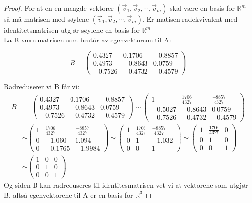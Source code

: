\documentclass[a4paper, norsk, twoside, 10pt]{article}
\begin{document}
\begin{proof}
For at en en mengde vektorer $(\vec{v}_{1}, \vec{v}_{2}, \cdots, \vec{v}_{m})$ skal være en basis for
$\mathbb{R}^{m}$ så må matrisen med søylene $(\vec{v}_{1}, \vec{v}_{2}, \cdots, \vec{v}_{m})$. Er matisen radekvivalent med identitetsmatrisen utgjør søylene en basis for $\mathbb{R}^{m}$
\\
La B være matrisen som består av egenvektorene til A:
\def\Bmatrise{
\begin{pmatrix}
  0.4327 & 0.1706 & -0.8857\\
  0.4973 & -0.8643 & 0.0759\\
  -0.7526 & -0.4732 & -0.4579
\end{pmatrix}
}

\[B = \Bmatrise\]

Radreduserer vi B får vi:
\[\begin{split}
B &= \Bmatrise \sim
\begin{pmatrix}
  1 & \frac{1706}{4327} & \frac{-8857}{4327}\\
  -0.5027 & -0.8643 & 0.0759\\
  -0.7526 & -0.4732 & -0.4579
\end{pmatrix} \\
&\sim 
\begin{pmatrix}
  1 & \frac{1706}{4327} & \frac{-8857}{4327}\\
  0 & -1.060 & 1.094\\
  0 & -0.1765 & -1.9984
\end{pmatrix}
\sim
\begin{pmatrix}
  1 & \frac{1706}{4327} & \frac{-8857}{4327}\\
  0 & 1 & -1.032\\
  0 & 0 & 1
\end{pmatrix}
\sim
\begin{pmatrix}
  1 & \frac{1706}{4327} & 0\\
  0 & 1 & 0\\
  0 & 0 & 1
\end{pmatrix}
\\ &\sim
\begin{pmatrix}
  1 & 0 & 0\\
  0 & 1 & 0\\
  0 & 0 & 1
\end{pmatrix}
\end{split}\]
Og siden B kan radreduseres til identitesmatrisen vet vi at vektorene som utgjør B, altså egenvektorene til A er en basis for $\mathbb{R}^{3}$
\end{proof}
\end{document}
